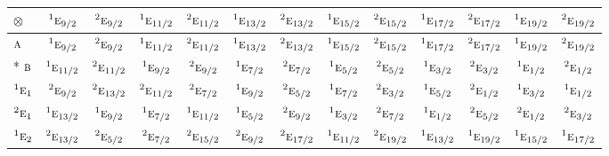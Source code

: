 \documentclass[10pt,a4paper]{article}
\numberwithin{equation}{section}
\newcommand{\irr}[1]{\text{\normalfont\scshape #1}}
\newcommand{\conjpair}[1]{{}^{#1}}
\newcommand{\irrprod}{\otimes}
\begin{document}
{\small\setlength{\tabcolsep}{3pt}\begin{longtable}{@{}lcccccccccccc@{}}\toprule
$\irrprod$ & $\conjpair{1}\irr{e}_{9/2}$ & $\conjpair{2}\irr{e}_{9/2}$ & $\conjpair{1}\irr{e}_{11/2}$ & $\conjpair{2}\irr{e}_{11/2}$ & $\conjpair{1}\irr{e}_{13/2}$ & $\conjpair{2}\irr{e}_{13/2}$ & $\conjpair{1}\irr{e}_{15/2}$ & $\conjpair{2}\irr{e}_{15/2}$ & $\conjpair{1}\irr{e}_{17/2}$ & $\conjpair{2}\irr{e}_{17/2}$ & $\conjpair{1}\irr{e}_{19/2}$ & $\conjpair{2}\irr{e}_{19/2}$\\\midrule\endhead
\bottomrule\endfoot\endlastfoot
$\irr{a}$ & $\conjpair{1}\irr{e}_{9/2}$ & $\conjpair{2}\irr{e}_{9/2}$ & $\conjpair{1}\irr{e}_{11/2}$ & $\conjpair{2}\irr{e}_{11/2}$ & $\conjpair{1}\irr{e}_{13/2}$ & $\conjpair{2}\irr{e}_{13/2}$ & $\conjpair{1}\irr{e}_{15/2}$ & $\conjpair{2}\irr{e}_{15/2}$ & $\conjpair{1}\irr{e}_{17/2}$ & $\conjpair{2}\irr{e}_{17/2}$ & $\conjpair{1}\irr{e}_{19/2}$ & $\conjpair{2}\irr{e}_{19/2}$\\*
$\irr{b}$ & $\conjpair{1}\irr{e}_{11/2}$ & $\conjpair{2}\irr{e}_{11/2}$ & $\conjpair{1}\irr{e}_{9/2}$ & $\conjpair{2}\irr{e}_{9/2}$ & $\conjpair{1}\irr{e}_{7/2}$ & $\conjpair{2}\irr{e}_{7/2}$ & $\conjpair{1}\irr{e}_{5/2}$ & $\conjpair{2}\irr{e}_{5/2}$ & $\conjpair{1}\irr{e}_{3/2}$ & $\conjpair{2}\irr{e}_{3/2}$ & $\conjpair{1}\irr{e}_{1/2}$ & $\conjpair{2}\irr{e}_{1/2}$\\
$\conjpair{1}\irr{e}_{1}$ & $\conjpair{2}\irr{e}_{9/2}$ & $\conjpair{2}\irr{e}_{13/2}$ & $\conjpair{2}\irr{e}_{11/2}$ & $\conjpair{2}\irr{e}_{7/2}$ & $\conjpair{1}\irr{e}_{9/2}$ & $\conjpair{2}\irr{e}_{5/2}$ & $\conjpair{1}\irr{e}_{7/2}$ & $\conjpair{2}\irr{e}_{3/2}$ & $\conjpair{1}\irr{e}_{5/2}$ & $\conjpair{2}\irr{e}_{1/2}$ & $\conjpair{1}\irr{e}_{3/2}$ & $\conjpair{1}\irr{e}_{1/2}$\\
$\conjpair{2}\irr{e}_{1}$ & $\conjpair{1}\irr{e}_{13/2}$ & $\conjpair{1}\irr{e}_{9/2}$ & $\conjpair{1}\irr{e}_{7/2}$ & $\conjpair{1}\irr{e}_{11/2}$ & $\conjpair{1}\irr{e}_{5/2}$ & $\conjpair{2}\irr{e}_{9/2}$ & $\conjpair{1}\irr{e}_{3/2}$ & $\conjpair{2}\irr{e}_{7/2}$ & $\conjpair{1}\irr{e}_{1/2}$ & $\conjpair{2}\irr{e}_{5/2}$ & $\conjpair{2}\irr{e}_{1/2}$ & $\conjpair{2}\irr{e}_{3/2}$\\
$\conjpair{1}\irr{e}_{2}$ & $\conjpair{2}\irr{e}_{13/2}$ & $\conjpair{2}\irr{e}_{5/2}$ & $\conjpair{2}\irr{e}_{7/2}$ & $\conjpair{2}\irr{e}_{15/2}$ & $\conjpair{2}\irr{e}_{9/2}$ & $\conjpair{2}\irr{e}_{17/2}$ & $\conjpair{1}\irr{e}_{11/2}$ & $\conjpair{2}\irr{e}_{19/2}$ & $\conjpair{1}\irr{e}_{13/2}$ & $\conjpair{1}\irr{e}_{19/2}$ & $\conjpair{1}\irr{e}_{15/2}$ & $\conjpair{1}\irr{e}_{17/2}$\\

\end{longtable}}
\end{document}
